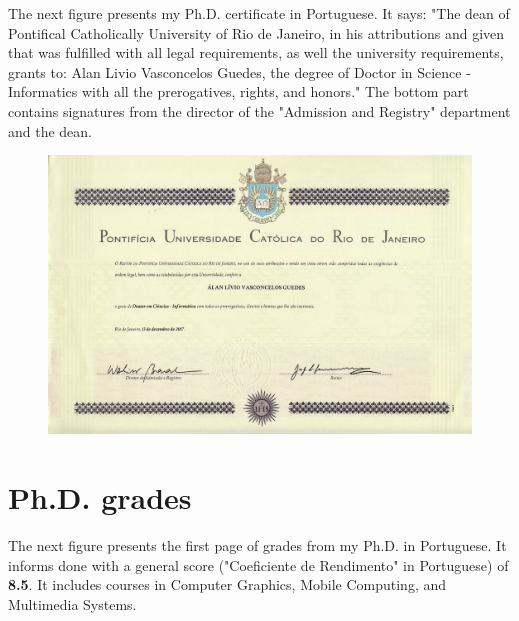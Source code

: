 \documentclass[10pt,a4paper,sans,colorlinks]{moderncv}
\begin{document}
The next figure presents my Ph.D. certificate in Portuguese.
It says: "The dean of Pontifical Catholically University of Rio de Janeiro, in his attributions and given that was fulfilled with all legal requirements, as well the university requirements, grants to: Alan Livio Vasconcelos Guedes, the degree of Doctor in Science - Informatics with all the prerogatives, rights, and honors."
The bottom part contains signatures from the director of the "Admission and Registry" department and the dean.

\begin{figure}
    \centering
    \includegraphics[align=t,width=\textwidth,height=0.3\paperheight, keepaspectratio=true]{certificates/phd-certificate.pdf}
\end{figure}

\newpage

\section{Ph.D. grades}

The next figure presents the first page of grades from my Ph.D. in Portuguese.
It informs done with a general score ("Coeficiente de Rendimento" in Portuguese) of \textbf{8.5}.
It includes courses in Computer Graphics, Mobile Computing, and Multimedia Systems.
\end{document}
